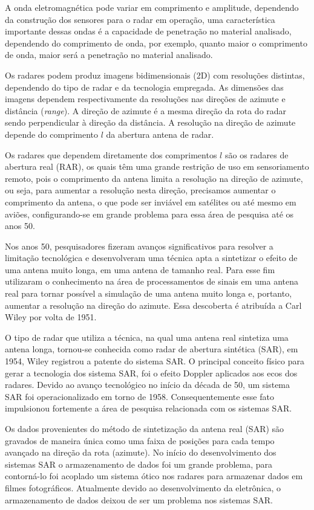 A onda eletromagnética pode variar em comprimento e amplitude, dependendo da construção dos sensores para o radar em operação, uma característica importante dessas ondas é a capacidade de penetração no material analisado, dependendo do comprimento de onda, por exemplo, quanto maior o comprimento de onda, maior será a penetração no material analisado. 

Os radares podem produz imagens bidimensionais (2D) com resoluções distintas, dependendo do tipo de radar e da tecnologia empregada. As dimensões das imagens dependem respectivamente da resoluções nas direções de azimute e distância (\textit{range}). A direção de azimute é a mesma direção da rota do radar sendo perpendicular à direção da distância. A resolução na direção de azimute depende do comprimento $l$ da abertura antena de radar.  

Os radares que dependem diretamente dos comprimentos $l$ são os radares de abertura real (RAR), os quais têm uma grande restrição de uso em sensoriamento remoto, pois o comprimento da antena limita a resolução na direção de azimute, ou seja, para aumentar a resolução nesta direção, precisamos aumentar o comprimento da antena, o que pode ser inviável em satélites ou até mesmo em aviões, configurando-se em grande problema para essa área de pesquisa até os anos 50.  

Nos anos 50, pesquisadores fizeram avanços significativos para resolver a limitação tecnológica e desenvolveram uma técnica apta a sintetizar o efeito de uma antena muito longa, em uma antena de tamanho real. Para esse fim utilizaram o conhecimento na área de  processamentos de sinais em uma antena real para tornar possível a simulação de uma antena muito longa e, portanto, aumentar a resolução na direção do azimute. Essa descoberta é atribuída a Carl Wiley por volta de 1951.

O tipo de radar que utiliza a técnica, na qual uma antena real sintetiza uma antena longa, tornou-se conhecida como radar de abertura sintética (SAR), em 1954, Wiley registrou a patente do sistema SAR. O principal conceito físico para gerar a tecnologia dos sistema SAR, foi o efeito Doppler aplicados aos ecos dos radares. Devido ao avanço tecnológico no início da década de 50, um sistema SAR foi operacionalizado em torno de 1958. Consequentemente esse fato impulsionou fortemente a área de pesquisa relacionada com os sistemas SAR. 

Os dados provenientes do método de sintetização da antena real (SAR) são gravados de maneira única como uma faixa de posições para cada tempo avançado na direção da rota (azimute). No início do desenvolvimento dos sistemas SAR o armazenamento de dados foi um grande problema, para contorná-lo foi acoplado um sistema ótico nos radares para armazenar dados em filmes fotográficos. Atualmente devido ao desenvolvimento da eletrônica, o armazenamento de dados deixou de ser um problema nos sistemas SAR.

